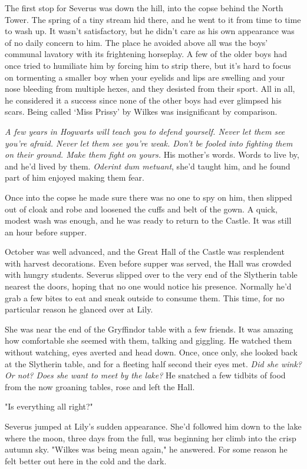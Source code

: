 \documentclass[a4paper,11pt]{article}
\begin{document}
The first stop for Severus was down the hill, into the copse behind the North Tower. The spring of a tiny stream hid there, and he went to it from time to time to wash up. It wasn't satisfactory, but he didn't care as his own appearance was of no daily concern to him. The place he avoided above all was the boys' communal lavatory with its frightening horseplay. A few of the older boys had once tried to humiliate him by forcing him to strip there, but it's hard to focus on tormenting a smaller boy when your eyelids and lips are swelling and your nose bleeding from multiple hexes, and they desisted from their sport. All in all, he considered it a success since none of the other boys had ever glimpsed his scars. Being called `Miss Prissy' by Wilkes was insignificant by comparison.

\emph{A few years in Hogwarts will teach you to defend yourself. Never let them see you're afraid. Never let them see you're weak. Don't be fooled into fighting them on their ground. Make them fight on yours.} His mother's words. Words to live by, and he'd lived by them. \emph{Oderint dum metuant}, she'd taught him, and he found part of him enjoyed making them fear.

Once into the copse he made sure there was no one to spy on him, then slipped out of cloak and robe and loosened the cuffs and belt of the gown. A quick, modest wash was enough, and he was ready to return to the Castle. It was still an hour before supper.

October was well advanced, and the Great Hall of the Castle was resplendent with harvest decorations. Even before supper was served, the Hall was crowded with hungry students. Severus slipped over to the very end of the Slytherin table nearest the doors, hoping that no one would notice his presence. Normally he'd grab a few bites to eat and sneak outside to consume them. This time, for no particular reason he glanced over at Lily.

She was near the end of the Gryffindor table with a few friends. It was amazing how comfortable she seemed with them, talking and giggling. He watched them without watching, eyes averted and head down. Once, once only, she looked back at the Slytherin table, and for a fleeting half second their eyes met. \emph{Did she wink? Or not? Does she want to meet by the lake?} He snatched a few tidbits of food from the now groaning tables, rose and left the Hall.

"Is everything all right?"

Severus jumped at Lily's sudden appearance. She'd followed him down to the lake where the moon, three days from the full, was beginning her climb into the crisp autumn sky. "Wilkes was being mean again," he answered. For some reason he felt better out here in the cold and the dark.
\end{document}
